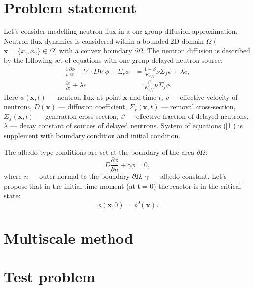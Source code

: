 \documentclass[runningheads]{llncs}
\begin{document}
\section{Problem statement}
Let's consider modelling neutron flux in a one-group diffusion approximation. Neutron flux dynamics is considered within a bounded 2D domain  $\Omega$ ($\bm x = \{x_1, x_2\} \in \Omega$) with a convex boundary $\partial \Omega$. The neutron diffusion is described by the following set of equations with one group delayed neutron source:
\begin{equation}\label{1}
\begin{split}
 \frac{1}{v} \frac{\partial \phi}{\partial t} - \nabla \cdot D \nabla \phi + \Sigma_r \phi &= \frac{1 - \beta}{K_{eff}} \nu \Sigma_f \phi + \lambda c, \\
\frac{\partial c}{\partial t} + \lambda c &= \frac{\beta}{K_{eff}} \nu \Sigma_f \phi.
\end{split}
\end{equation} 
Here $\phi(\bm x,t)$ --- neutron flux  at point $\bm x$ and time $t$,
$v$ --- effective velocity of neutrons,
$D(\bm x)$ --- diffusion coefficient, 
$\Sigma_r(\bm x,t)$ --- removal cross-section,
$\Sigma_f(\bm x,t)$ --- generation cross-section,
$\beta$ --- effective fraction of delayed neutrons, 
$\lambda$ --- decay constant of sources of delayed neutrons.
System of equations (\ref{1}) is supplement with boundary condition and  initial condition.

The albedo-type conditions are set at the boundary of the area $\partial \Omega$:
\begin{equation}\label{2}
 D\frac{\partial \phi}{\partial n} + \gamma \phi = 0,
\end{equation}
where $n$ --- outer normal to the boundary $\partial \Omega$, $\gamma$ --- albedo constant.
Let's propose that in the initial time moment (at t = 0) the reactor is in the
critical state:
\begin{equation}\label{3}
 \phi(\bm x,0) = \phi^0(\bm x).
\end{equation} 

\section{Multiscale method}

\section{Test problem}
\end{document}
